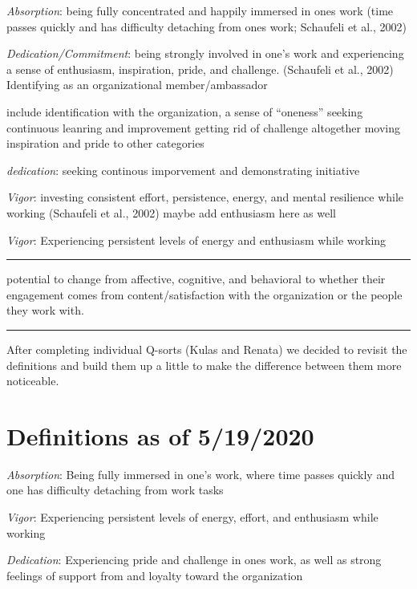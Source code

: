 \documentclass[
]{book}
\begin{document}
\emph{Absorption}: being fully concentrated and happily immersed in ones work (time passes quickly and has difficulty detaching from ones work; Schaufeli et al., 2002)

\emph{Dedication/Commitment}: being strongly involved in one's work and experiencing a sense of enthusiasm, inspiration, pride, and challenge. (Schaufeli et al., 2002) Identifying as an organizational member/ambassador

include identification with the organization, a sense of ``oneness''
seeking continuous leanring and improvement
getting rid of challenge altogether
moving inspiration and pride to other categories

\emph{dedication}: seeking continous imporvement and demonstrating initiative

\emph{Vigor}: investing consistent effort, persistence, energy, and mental resilience while working (Schaufeli et al., 2002)
maybe add enthusiasm here as well

\emph{Vigor}: Experiencing persistent levels of energy and enthusiasm while working

\begin{center}\rule{0.5\linewidth}{0.5pt}\end{center}

potential to change from affective, cognitive, and behavioral to whether their engagement comes from content/satisfaction with the organization or the people they work with.

\begin{center}\rule{0.5\linewidth}{0.5pt}\end{center}

After completing individual Q-sorts (Kulas and Renata) we decided to revisit the definitions and build them up a little to make the difference between them more noticeable.

\hypertarget{definitions-as-of-5192020}{%
\section{Definitions as of 5/19/2020}\label{definitions-as-of-5192020}}

\emph{Absorption}: Being fully immersed in one's work, where time passes quickly and one has difficulty detaching from work tasks

\emph{Vigor}: Experiencing persistent levels of energy, effort, and enthusiasm while working

\emph{Dedication}: Experiencing pride and challenge in ones work, as well as strong feelings of support from and loyalty toward the organization
\end{document}
